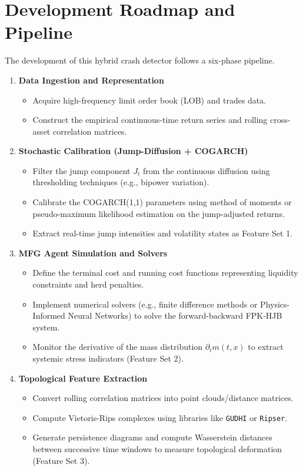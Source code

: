 \documentclass[11pt, a4paper]{article}
\begin{document}
\section{Development Roadmap and Pipeline}

The development of this hybrid crash detector follows a six-phase pipeline.

\begin{enumerate}[label=\textbf{Phase \arabic*:}, leftmargin=*]
    \item \textbf{Data Ingestion and Representation}
    \begin{itemize}
        \item Acquire high-frequency limit order book (LOB) and trades data.
        \item Construct the empirical continuous-time return series and rolling cross-asset correlation matrices.
    \end{itemize}

    \item \textbf{Stochastic Calibration (Jump-Diffusion + COGARCH)}
    \begin{itemize}
        \item Filter the jump component $J_t$ from the continuous diffusion using thresholding techniques (e.g., bipower variation).
        \item Calibrate the COGARCH(1,1) parameters using method of moments or pseudo-maximum likelihood estimation on the jump-adjusted returns.
        \item Extract real-time jump intensities and volatility states as Feature Set 1.
    \end{itemize}

    \item \textbf{MFG Agent Simulation and Solvers}
    \begin{itemize}
        \item Define the terminal cost and running cost functions representing liquidity constraints and herd penalties.
        \item Implement numerical solvers (e.g., finite difference methods or Physics-Informed Neural Networks) to solve the forward-backward FPK-HJB system.
        \item Monitor the derivative of the mass distribution $\partial_t m(t,x)$ to extract systemic stress indicators (Feature Set 2).
    \end{itemize}

    \item \textbf{Topological Feature Extraction}
    \begin{itemize}
        \item Convert rolling correlation matrices into point clouds/distance matrices.
        \item Compute Vietoris-Rips complexes using libraries like \texttt{GUDHI} or \texttt{Ripser}.
        \item Generate persistence diagrams and compute Wasserstein distances between successive time windows to measure topological deformation (Feature Set 3).
    \end{itemize}


\end{enumerate}
\end{document}
